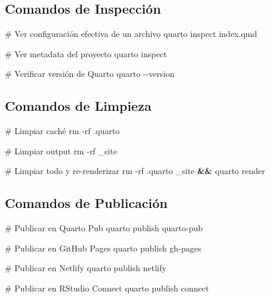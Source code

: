 \documentclass[
  doc,
  floatsintext,
  longtable,
  a4paper,
  nolmodern,
  notxfonts,
  notimes,
  12pt,
  colorlinks=true,linkcolor=blue,citecolor=blue,urlcolor=blue]{apa7}
\newenvironment{Shaded}{\begin{snugshade}}{\end{snugshade}}
\newcommand{\AttributeTok}[1]{\textcolor[rgb]{0.40,0.45,0.13}{#1}}
\newcommand{\CommentTok}[1]{\textcolor[rgb]{0.37,0.37,0.37}{#1}}
\newcommand{\ExtensionTok}[1]{\textcolor[rgb]{0.00,0.23,0.31}{#1}}
\newcommand{\FunctionTok}[1]{\textcolor[rgb]{0.28,0.35,0.67}{#1}}
\newcommand{\KeywordTok}[1]{\textcolor[rgb]{0.00,0.23,0.31}{\textbf{#1}}}
\newcommand{\NormalTok}[1]{\textcolor[rgb]{0.00,0.23,0.31}{#1}}
\begin{document}
\subsection{Comandos de Inspección}\label{comandos-de-inspecciuxf3n}

\begin{Shaded}
\begin{Highlighting}[]
\CommentTok{\# Ver configuración efectiva de un archivo}
\ExtensionTok{quarto}\NormalTok{ inspect index.qmd}

\CommentTok{\# Ver metadata del proyecto}
\ExtensionTok{quarto}\NormalTok{ inspect}

\CommentTok{\# Verificar versión de Quarto}
\ExtensionTok{quarto} \AttributeTok{{-}{-}version}
\end{Highlighting}
\end{Shaded}

\subsection{Comandos de Limpieza}\label{comandos-de-limpieza}

\begin{Shaded}
\begin{Highlighting}[]
\CommentTok{\# Limpiar caché}
\FunctionTok{rm} \AttributeTok{{-}rf}\NormalTok{ .quarto}

\CommentTok{\# Limpiar output}
\FunctionTok{rm} \AttributeTok{{-}rf}\NormalTok{ \_site}

\CommentTok{\# Limpiar todo y re{-}renderizar}
\FunctionTok{rm} \AttributeTok{{-}rf}\NormalTok{ .quarto \_site }\KeywordTok{\&\&} \ExtensionTok{quarto}\NormalTok{ render}
\end{Highlighting}
\end{Shaded}

\subsection{Comandos de Publicación}\label{comandos-de-publicaciuxf3n}

\begin{Shaded}
\begin{Highlighting}[]
\CommentTok{\# Publicar en Quarto Pub}
\ExtensionTok{quarto}\NormalTok{ publish quarto{-}pub}

\CommentTok{\# Publicar en GitHub Pages}
\ExtensionTok{quarto}\NormalTok{ publish gh{-}pages}

\CommentTok{\# Publicar en Netlify}
\ExtensionTok{quarto}\NormalTok{ publish netlify}

\CommentTok{\# Publicar en RStudio Connect}
\ExtensionTok{quarto}\NormalTok{ publish connect}
\end{Highlighting}
\end{Shaded}
\end{document}
